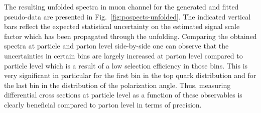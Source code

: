 {\hspace{0.02\textwidth}
}

The resulting unfolded spectra in muon channel for the generated and fitted pseudo-data are presented in Fig.~\ref{fig:pospects-unfolded}. The indicated vertical bars reflect the expected statistical uncertainty on the estimated signal scale factor which has been propagated through the unfolding. Comparing the obtained spectra at particle and parton level side-by-side one can observe that the uncertainties in certain bins are largely increased at parton level compared to particle level which is a result of a low selection efficiency in those bins. This is very significant in particular for the first bin in the top quark \pt distribution and for the last bin in the distribution of the polarization angle. Thus, measuring differential cross sections at particle level as a function of these observables is clearly beneficial compared to parton level in terms of precision.

